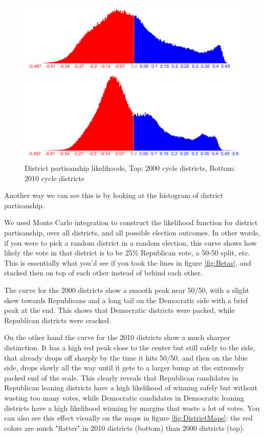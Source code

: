 \documentclass[preprint,12pt]{article}
\begin{document}
\begin{figure}[htb!]
    \begin{center}
        \includegraphics[scale=0.25]{../Figures/WI_compared/district_partisanship_cropped.png}
        \caption{District partisanship likelihoods, Top: 2000 cycle districts, Bottom: 2010 cycle districts}\label{fig:LikelihoodsDistrictPartisanship}
    \end{center}
\end{figure}

Another way we can see this is by looking at the histogram of district partisanship.
 
We used Monte Carlo integration to construct the likelihood function for district partisanship, over all districts, and all possible election outcomes.
In other words, if you were to pick a random district in a random election, this curve shows how likely the vote in that district is to be 25\% Republican vote, a 50-50 split, etc.
This is essentially what you'd see if you took the lines in figure \ref{fig:Betas}, and stacked then on top of each other instead of behind each other. 
 
The curve for the 2000 districts show a smooth peak near 50/50, with a slight skew towards Republicans and a long tail on the Democratic side with a brief peak at the end.  
This shows that Democratic districts were packed, while Republican districts were cracked.

On the other hand the curve for the 2010 districts show a much sharper distinction.
It has a high red peak close to the center but still safely to the side, that already drops off sharply by the time it hits 50/50, and then on the blue side, drops slowly all the way until it gets to a larger bump at the extremely packed end of the scale.
This clearly reveals that Republican candidates in Republican leaning districts have a high likelihood of winning safely but without wasting too many votes, while Democratic candidates in Democratic leaning districts have a high likelihood winning by margins that waste a lot of votes.
You can also see this effect visually on the maps in figure \ref{fig:DistrictMaps}: the red colors are much "flatter" in 2010 districts (bottom) than 2000 districts (top).
\end{document}
